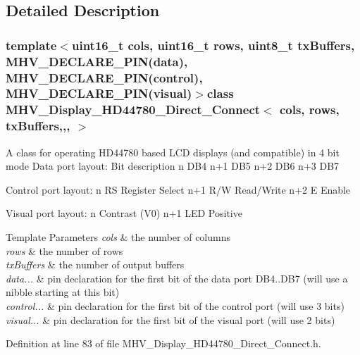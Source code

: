 \subsection{Detailed Description}
\subsubsection*{template$<$uint16\-\_\-t cols, uint16\-\_\-t rows, uint8\-\_\-t tx\-Buffers, M\-H\-V\-\_\-\-D\-E\-C\-L\-A\-R\-E\-\_\-\-P\-I\-N(data), M\-H\-V\-\_\-\-D\-E\-C\-L\-A\-R\-E\-\_\-\-P\-I\-N(control), M\-H\-V\-\_\-\-D\-E\-C\-L\-A\-R\-E\-\_\-\-P\-I\-N(visual)$>$class M\-H\-V\-\_\-\-Display\-\_\-\-H\-D44780\-\_\-\-Direct\-\_\-\-Connect$<$ cols, rows, tx\-Buffers,,, $>$}

A class for operating H\-D44780 based L\-C\-D displays (and compatible) in 4 bit mode Data port layout\-: Bit description n D\-B4 n+1 D\-B5 n+2 D\-B6 n+3 D\-B7

Control port layout\-: n R\-S Register Select n+1 R/\-W Read/\-Write n+2 E Enable

Visual port layout\-: n Contrast (V0) n+1 L\-E\-D Positive


\begin{DoxyTemplParams}{Template Parameters}
{\em cols} & the number of columns \\
\hline
{\em rows} & the number of rows \\
\hline
{\em tx\-Buffers} & the number of output buffers \\
\hline
{\em data...} & pin declaration for the first bit of the data port D\-B4..D\-B7 (will use a nibble starting at this bit) \\
\hline
{\em control...} & pin declaration for the first bit of the control port (will use 3 bits) \\
\hline
{\em visual...} & pin declaration for the first bit of the visual port (will use 2 bits) \\
\hline
\end{DoxyTemplParams}


Definition at line 83 of file M\-H\-V\-\_\-\-Display\-\_\-\-H\-D44780\-\_\-\-Direct\-\_\-\-Connect.\-h.



